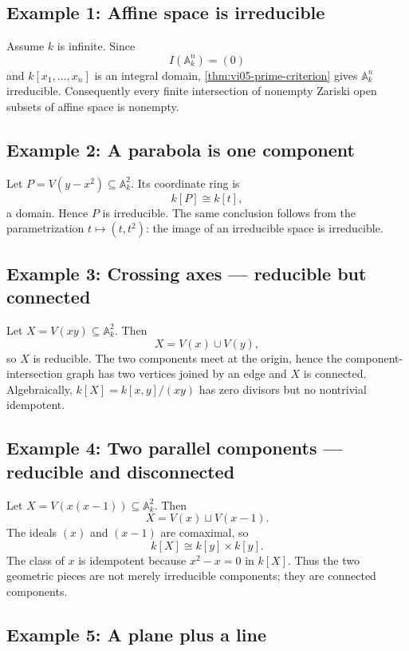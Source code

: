 
\subsection*{Example 1: Affine space is irreducible}

Assume \(k\) is infinite.  Since
\[
I(\mathbb A_k^n)=(0)
\]
and \(k[x_1,\dots,x_n]\) is an integral domain, \cref{thm:vi05-prime-criterion} gives
\(\mathbb A_k^n\) irreducible.  Consequently every finite intersection of nonempty
Zariski open subsets of affine space is nonempty.

\subsection*{Example 2: A parabola is one component}

Let \(P=V(y-x^2)\subseteq\mathbb A_k^2\).  Its coordinate ring is
\[
k[P]\cong k[t],
\]
a domain.  Hence \(P\) is irreducible.  The same conclusion follows from the
parametrization \(t\mapsto(t,t^2)\): the image of an irreducible space is irreducible.

\subsection*{Example 3: Crossing axes --- reducible but connected}

Let \(X=V(xy)\subseteq\mathbb A_k^2\).  Then
\[
X=V(x)\cup V(y),
\]
so \(X\) is reducible.  The two components meet at the origin, hence the
component-intersection graph has two vertices joined by an edge and \(X\) is connected.
Algebraically, \(k[X]=k[x,y]/(xy)\) has zero divisors but no nontrivial idempotent.

\subsection*{Example 4: Two parallel components --- reducible and disconnected}

Let \(X=V(x(x-1))\subseteq\mathbb A_k^2\).  Then
\[
X=V(x)\sqcup V(x-1).
\]
The ideals \((x)\) and \((x-1)\) are comaximal, so
\[
k[X]\cong k[y]\times k[y].
\]
The class of \(x\) is idempotent because \(x^2-x=0\) in \(k[X]\).  Thus the two
geometric pieces are not merely irreducible components; they are connected components.

\subsection*{Example 5: A plane plus a line}

